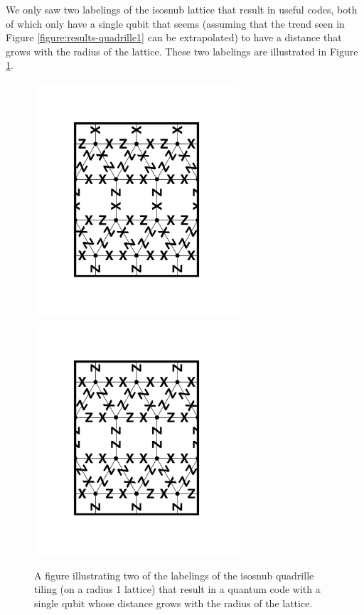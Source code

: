 \documentclass[12pt]{amsbook}
\theoremstyle{plain}
\theoremstyle{definition}
\theoremstyle{remark}
\begin{document}
We only saw two labelings of the isosnub lattice that result in useful codes, both of which only have a single qubit that seems (assuming that the trend seen in Figure \ref{figure:results-quadrille1} can be extrapolated) to have a distance that grows with the radius of the lattice.  These two labelings are illustrated in Figure \ref{figure:isosnub-quadrille-code-r-labeling}.

\begin{figure}
\includegraphics[width=3in]{images/isosnub-quadrille-code-labeling-1} %
\includegraphics[width=3in]{images/isosnub-quadrille-code-labeling-2} %
\caption{
\label{figure:isosnub-quadrille-code-r-labeling}
A figure illustrating two of the labelings of the isosnub quadrille tiling (on a radius 1 lattice) that result in a quantum code with a single qubit whose distance grows with the radius of the lattice.
}
\end{figure}
\end{document}
